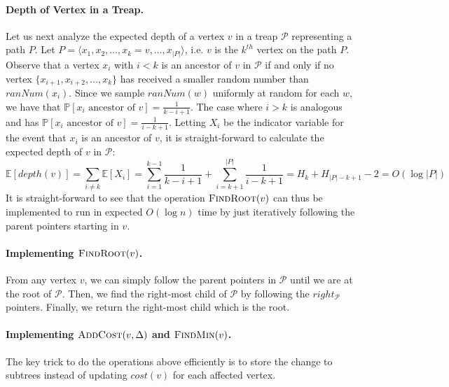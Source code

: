 \paragraph{Depth of Vertex in a Treap.} Let us next analyze the expected depth of a vertex $v$ in a treap $\mathcal{P}$ representing a path $P$. Let $P = \langle x_1, x_2, \dots, x_k = v, \dots, x_{|P|}\rangle$, i.e. $v$ is the $k^{th}$ vertex on the path $P$. Observe that a vertex $x_i$ with $i < k$ is an ancestor of $v$ in $\mathcal{P}$ if and only if no vertex $\{x_{i+1}, x_{i+2}, \dots, x_k\}$ has received a smaller random number than $ranNum(x_i)$. Since we sample $ranNum(w)$ uniformly at random for each $w$, we have that $\mathbb{P}[x_i \text{ ancestor of } v] = \frac{1}{k-i+1}$. The case where $i > k$ is analogous and has $\mathbb{P}[x_i \text{ ancestor of } v] = \frac{1}{i-k+1}$. Letting $X_i$ be the indicator variable for the event that $x_i$ is an ancestor of $v$, it is straight-forward to calculate the expected depth of $v$ in $\mathcal{P}$:
\[
    \mathbb{E}[depth(v)] = \sum_{i \neq k} \mathbb{E}[X_i] =  \sum_{i = 1}^{k-1}\frac{1}{k-i+1} + \sum_{i = k+1}^{|P|} \frac{1}{i-k+1} = H_k + H_{|P|-k+1} - 2 = O(\log |P|)
\]
It is straight-forward to see that the operation $\textsc{FindRoot}(v)$ can thus be implemented to run in expected $O(\log n)$ time by just iteratively following the parent pointers starting in $v$.

\paragraph{Implementing $\textsc{FindRoot}(v)$.} From any vertex $v$, we can simply follow the parent pointers in $\mathcal{P}$ until we are at the root of $\mathcal{P}$. Then, we find the right-most child of $\mathcal{P}$ by following the $right_{\mathcal{P}}$ pointers. Finally, we return the right-most child which is the root.

\paragraph{Implementing $\textsc{AddCost}(v, \Delta)$ and $\textsc{FindMin}(v)$.} The key trick to do the operations above efficiently is to store the change to subtrees instead of updating $cost(v)$ for each affected vertex. 

